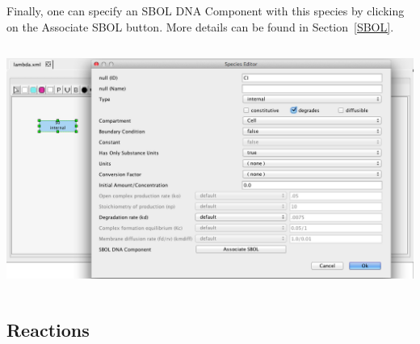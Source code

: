 \documentclass[titlepage,11pt]{article}
\begin{document}
\begin{itemize}
\end{itemize}
Finally, one can specify an SBOL DNA Component with this species by clicking on the Associate SBOL button.  More details can be found in Section~\ref{SBOL}.

\begin{center}
\includegraphics[height=80mm]{screenshots/species}
\end{center}

\subsection{\label{Reactions}Reactions}
\end{document}
